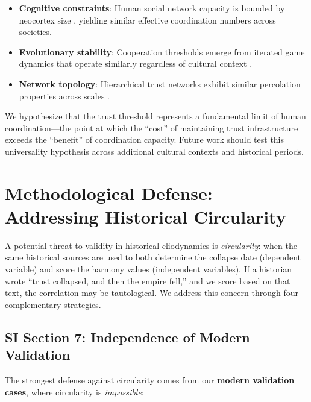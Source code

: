 \documentclass[11pt,a4paper]{article}
\begin{document}
\begin{itemize}
\item \textbf{Cognitive constraints}: Human social network capacity is bounded by neocortex size \citep{dunbar1992}, yielding similar effective coordination numbers across societies.
\item \textbf{Evolutionary stability}: Cooperation thresholds emerge from iterated game dynamics that operate similarly regardless of cultural context \citep{axelrod1984}.
\item \textbf{Network topology}: Hierarchical trust networks exhibit similar percolation properties across scales \citep{newman2010}.
\end{itemize}

We hypothesize that the trust threshold represents a fundamental limit of human coordination---the point at which the ``cost'' of maintaining trust infrastructure exceeds the ``benefit'' of coordination capacity. Future work should test this universality hypothesis across additional cultural contexts and historical periods.

\section{Methodological Defense: Addressing Historical Circularity}

A potential threat to validity in historical cliodynamics is \textit{circularity}: when the same historical sources are used to both determine the collapse date (dependent variable) and score the harmony values (independent variables). If a historian wrote ``trust collapsed, and then the empire fell,'' and we score based on that text, the correlation may be tautological. We address this concern through four complementary strategies.

\subsection{SI Section 7: Independence of Modern Validation}

The strongest defense against circularity comes from our \textbf{modern validation cases}, where circularity is \textit{impossible}:
\end{document}
